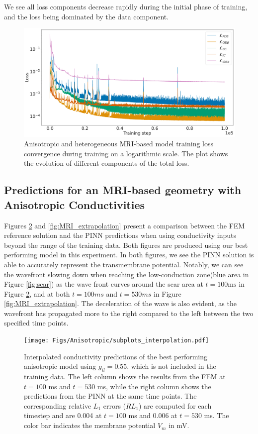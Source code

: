 We see all loss components decrease rapidly during the initial phase of training, and the loss being dominated by the data component.
\begin{figure}[H]
  \centering
  \includegraphics[width=\linewidth]{Figs/Anisotropic/loss_aniso.pdf}
  \caption{Anisotropic and heterogeneous MRI-based model training loss convergence during training on a logarithmic scale. The plot shows the evolution of different components of the total loss.}
  \label{fig:loss_aniso}
\end{figure}


\subsection{Predictions for an MRI-based geometry with Anisotropic Conductivities}



Figures \ref{fig:MRI_interpolation} and \ref{fig:MRI_extrapolation} present a comparison between the FEM reference solution and the PINN predictions when using conductivity inputs beyond the range of the training data. Both figures are produced using our best performing model in this experiment. In both figures, we see the PINN solution is able to accurately represent the transmembrane potential. Notably, we can see the wavefront slowing down when reaching the low-conduction zone(blue area in Figure \ref{fig:scar}) as the wave front curves around the scar area at $t=100 \mathrm{ms}$ in Figure \ref{fig:MRI_interpolation}, and at both $t=100 ms$ and $t=530 ms$ in Figure \ref{fig:MRI_extrapolation}. The deceleration of the wave is also evident, as the wavefront has propagated more to the right compared to the left between the two specified time points.
\begin{figure}[H]
  \centering
  \texttt{[image: Figs/Anisotropic/subplots\_interpolation.pdf]}
  \caption{Interpolated conductivity predictions of the best performing anisotropic model using \( g_{il} = 0.55 \), which is not included in the training data. The left column shows the results from the FEM at \( t = 100 \) ms and \( t = 530 \) ms, while the right column shows the predictions from the PINN at the same time points. The corresponding relative \( L_1 \) errors (\( RL_1 \)) are computed for each timestep and are 0.004 at \( t = 100 \) ms and 0.006 at \( t = 530 \) ms. The color bar indicates the membrane potential \( V_m \) in mV.}
  \label{fig:MRI_interpolation}
\end{figure}


